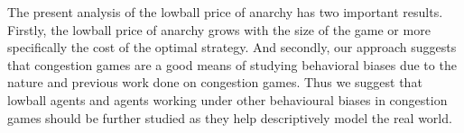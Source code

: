 \documentclass[twoside]{article}
\begin{document}
\begin{multicols}{2}
The present analysis of the lowball price of anarchy has two important results.  Firstly, the lowball price of anarchy grows with the size of the game or more specifically the cost of the optimal strategy.  And secondly, our approach suggests that congestion games are a good means of studying behavioral biases due to the nature and previous work done on congestion games.  Thus we suggest that lowball agents and agents working under other behavioural biases in congestion games should be further studied as they help descriptively model the real world.

\printbibliography






\end{multicols}
\end{document}
